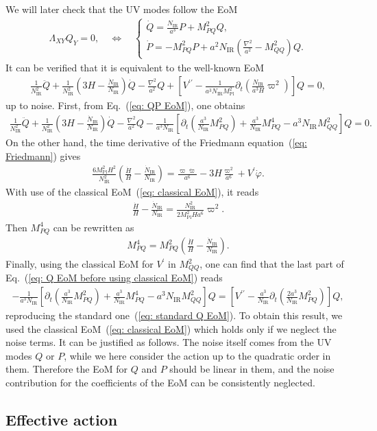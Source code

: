 \documentclass[aps, prd
, preprint
, nofootinbib 
]{revtex4-1}
\newcommand{\Mpl}{M_\text{Pl}}
\newcommand{\IR}{\text{IR}}
\newcommand{\dps}{\displaystyle}
\newcommand{\bae}[1]{\begin{align} #1 \end{align}}
\newcommand{\bce}[1]{\begin{cases} #1 \end{cases}}
\begin{document}
We will later check that the UV modes follow the EoM
\bae{\label{eq: QP EoM}
	\Lambda_{XY}Q_Y=0, \quad \Leftrightarrow \quad
	\bce{
		\dps
		\dot{Q}=\frac{N_\IR}{a^3}P+M_{PQ}^2Q, \\[10pt]
		\dps
		\dot{P}=-M_{PQ}^2P+a^2N_\IR\left(\frac{\nabla^2}{a^2}-M_{QQ}^2\right)Q.
	}
}
It can be verified that it is equivalent to the well-known EoM
\bae{\label{eq: standard Q EoM}
	\frac{1}{N_\IR^2}\ddot{Q}+\frac{1}{N_\IR^2}\left(3H-\frac{\dot{N}_\IR}{N_\IR}\right)\dot{Q}-\frac{\nabla^2}{a^2}Q
	+\left[V^{\prime\prime}-\frac{1}{a^3N_\IR\Mpl^2}\partial_t\left(\frac{N_\IR}{a^3H}\varpi^2\right)\right]Q=0,
}
up to noise.
First, from Eq.~(\ref{eq: QP EoM}), one obtains
\bae{\label{eq: Q EoM before using classical EoM}
	\frac{1}{N_\IR^2}\ddot{Q}+\frac{1}{N_\IR^2}\left(3H-\frac{\dot{N}_\IR}{N_\IR}\right)\dot{Q}-\frac{\nabla^2}{a^2}Q
	-\frac{1}{a^3N_\IR}\left[\partial_t\left(\frac{a^3}{N_\IR}M_{PQ}^2\right)+\frac{a^3}{N_\IR}M_{PQ}^4-a^3N_\IR M_{QQ}^2\right]Q=0.
}
On the other hand, the time derivative of the Friedmann equation~(\ref{eq: Friedmann}) gives
\bae{
	\frac{6\Mpl^2H^2}{N_\IR^2}\left(\frac{\dot{H}}{H}-\frac{\dot{N}_\IR}{N_\IR}\right)
	=\frac{\varpi\dot{\varpi}}{a^6}-3H\frac{\varpi^2}{a^6}+V^\prime\dot{\varphi}.
}
With use of the classical EoM~(\ref{eq: classical EoM}), it reads
\bae{
	\frac{\dot{H}}{H}-\frac{\dot{N}_\IR}{N_\IR}=\frac{N_\IR^2}{2\Mpl^2Ha^6}\varpi^2.
}
Then $M_{PQ}^4$ can be rewritten as
\bae{
	M_{PQ}^4=M_{PQ}^2\left(\frac{\dot{H}}{H}-\frac{\dot{N}_\IR}{N_\IR}\right).
}
Finally, using the classical EoM for $V^\prime$ in $M_{QQ}^2$, one can find that 
the last part of Eq.~(\ref{eq: Q EoM before using classical EoM}) reads
\bae{
	-\frac{1}{a^3N_\IR}\left[\partial_t\left(\frac{a^3}{N_\IR}M_{PQ}^2\right)+\frac{a^3}{N_\IR}M_{PQ}^4-a^3N_\IR M_{QQ}^2\right]Q
	=\left[V^{\prime\prime}-\frac{a^3}{N_\IR}\partial_t\left(\frac{2a^3}{N_\IR}M_{PQ}^2\right)\right]Q,
}
reproducing the standard one~(\ref{eq: standard Q EoM}). To obtain this result, we used the classical EoM~(\ref{eq: classical EoM}) which
holds only if we neglect the noise terms. It can be justified as follows. The noise itself comes from the UV modes $Q$ or $P$, while
we here consider the action up to the quadratic order in them. Therefore the EoM for $Q$ and $P$ should be linear in them,
and the noise contribution for the coefficients of the EoM can be consistently neglected.





\subsection{Effective action}
\end{document}
